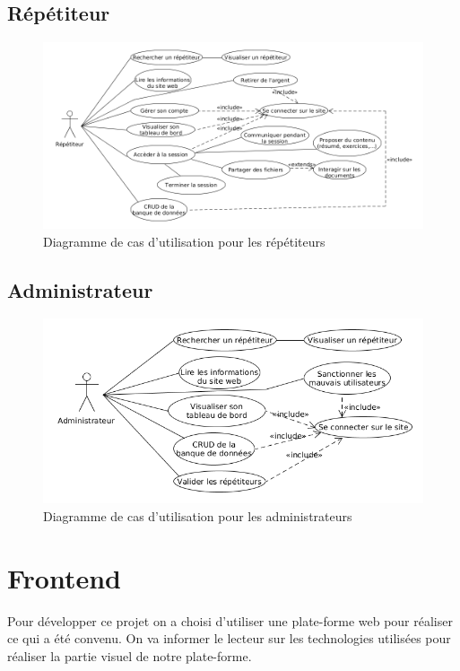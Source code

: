 \documentclass[a4paper]{scrreprt}
\begin{document}
\subsection{Répétiteur}
\begin{figure}[H]
  \centering
  \includegraphics[width=\textwidth]{img/UseCase_Repetiteur.png}
  \caption{Diagramme de cas d'utilisation pour les répétiteurs}
  \label{fig:uc_repetiteur}
\end{figure}

\subsection{Administrateur}
\begin{figure}[H]
  \centering
  \includegraphics[width=\textwidth]{img/UseCase_Administrateur.png}
  \caption{Diagramme de cas d'utilisation pour les administrateurs}
  \label{fig:uc_administrateur}
\end{figure}


\section{Frontend}
Pour développer ce projet on a choisi d'utiliser une plate-forme web pour réaliser ce qui a été convenu. On va informer le lecteur sur les technologies utilisées pour réaliser la partie visuel de notre plate-forme.
\end{document}
